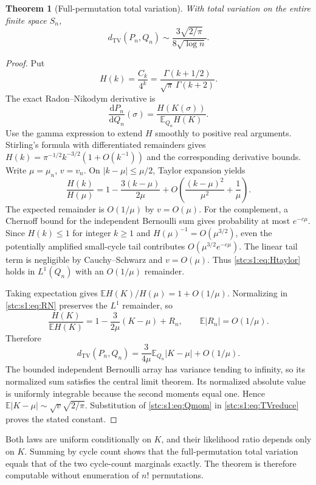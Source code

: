 \documentclass[11pt,letterpaper]{article}
\numberwithin{equation}{section}
\newtheorem{theorem}{Theorem}[section]
\theoremstyle{remark}\newtheorem{remark}[theorem]{Remark}
\newcommand{\E}{\mathbb E}
\newcommand{\TV}{d_{\mathrm{TV}}}
\newcommand{\Ga}{\Gamma}
\begin{document}
\begin{theorem}[Full-permutation total variation]\label{stc:s1:th:TV}
With total variation on the entire finite space $S_n$,
\begin{equation}\label{stc:s1:eq:TV}
 \TV(P_n,Q_n)\sim\frac{3\sqrt{2/\pi}}{8\sqrt{\log n}}.
\end{equation}
\end{theorem}
\begin{proof}
Put
\[
 H(k)=\frac{C_k}{4^k}
     =\frac{\Ga(k+1/2)}{\sqrt\pi\,\Ga(k+2)}.
\]
The exact Radon--Nikodym derivative is
\begin{equation}\label{stc:s1:eq:RN}
 \frac{\mathrm dP_n}{\mathrm dQ_n}(\sigma)
   =\frac{H(K(\sigma))}{\E_{Q_n}H(K)}.
\end{equation}
Use the gamma expression to extend $H$ smoothly to positive real arguments. Stirling's formula with differentiated remainders gives $H(k)=\pi^{-1/2}k^{-3/2}(1+O(k^{-1}))$ and the corresponding derivative bounds. Write $\mu=\mu_n$, $v=v_n$. On $|k-\mu|\leq\mu/2$, Taylor expansion yields
\begin{equation}\label{stc:s1:eq:Htaylor}
 \frac{H(k)}{H(\mu)}=1-\frac{3(k-\mu)}{2\mu}
       +O\left(\frac{(k-\mu)^2}{\mu^2}+\frac1\mu\right).
\end{equation}
The expected remainder is $O(1/\mu)$ by $v=O(\mu)$. For the complement, a Chernoff bound for the independent Bernoulli sum gives probability at most $e^{-c\mu}$. Since $H(k)\leq1$ for integer $k\geq1$ and $H(\mu)^{-1}=O(\mu^{3/2})$, even the potentially amplified small-cycle tail contributes $O(\mu^{3/2}e^{-c\mu})$. The linear tail term is negligible by Cauchy--Schwarz and $v=O(\mu)$. Thus \eqref{stc:s1:eq:Htaylor} holds in $L^1(Q_n)$ with an $O(1/\mu)$ remainder.

Taking expectation gives $\E H(K)/H(\mu)=1+O(1/\mu)$. Normalizing in \eqref{stc:s1:eq:RN} preserves the $L^1$ remainder, so
\[
 \frac{H(K)}{\E H(K)}=1-\frac3{2\mu}(K-\mu)+R_n,
 \qquad \E|R_n|=O(1/\mu).
\]
Therefore
\begin{equation}\label{stc:s1:eq:TVreduce}
 \TV(P_n,Q_n)=\frac3{4\mu}\E_{Q_n}|K-\mu|+O(1/\mu).
\end{equation}
The bounded independent Bernoulli array has variance tending to infinity, so its normalized sum satisfies the central limit theorem. Its normalized absolute value is uniformly integrable because the second moments equal one. Hence $\E|K-\mu|\sim\sqrt v\sqrt{2/\pi}$. Substitution of \eqref{stc:s1:eq:Qmom} in \eqref{stc:s1:eq:TVreduce} proves the stated constant.
\end{proof}
Both laws are uniform conditionally on $K$, and their likelihood ratio depends only on $K$. Summing by cycle count shows that the full-permutation total variation equals that of the two cycle-count marginals exactly. The theorem is therefore computable without enumeration of $n!$ permutations.
\end{document}
